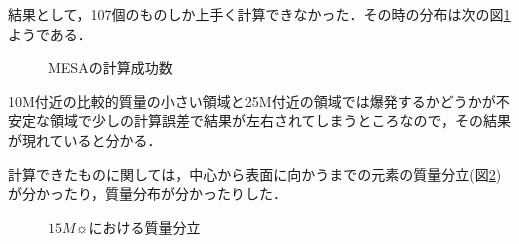 結果として，107個のものしか上手く計算できなかった．その時の分布は次の図\ref{fig:mesa_calc}ようである．

\begin{figure}[htbp]
  \begin{center}
  \end{center}
  \caption{MESAの計算成功数}
  \label{fig:mesa_calc}
\end{figure}

10M付近の比較的質量の小さい領域と25M付近の領域では爆発するかどうかが不安定な領域で少しの計算誤差で結果が左右されてしまうところなので，その結果が現れていると分かる．

計算できたものに関しては，中心から表面に向かうまでの元素の質量分立(図\ref{fig:mesa_frac})が分かったり，質量分布が分かったりした．

\begin{figure}[htbp]
  \begin{center}
  \end{center}
  \caption{$15M\sun$における質量分立}
  \label{fig:mesa_frac}
\end{figure}
